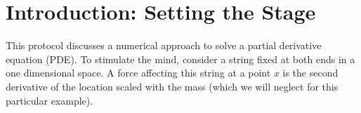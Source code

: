 \section{Introduction: Setting the Stage}

This protocol discusses a numerical approach to solve a partial derivative equation (PDE). To stimulate the mind, consider a string fixed at both ends in a one dimensional space. A force affecting this string at a point \(x\) is the second derivative of the location scaled with the mass (which we will neglect for this particular example).